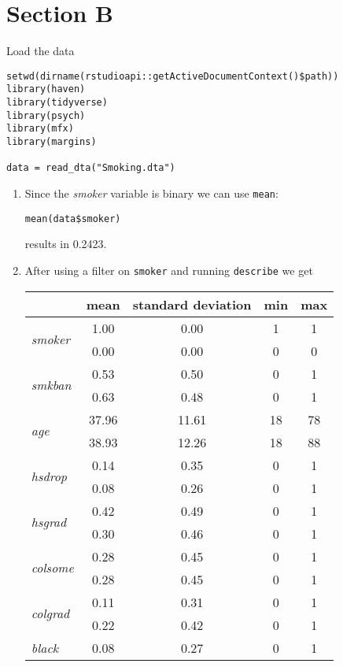 \documentclass{article}
\begin{document}
	\section*{Section B}
	Load the data
	\begin{lstlisting}
setwd(dirname(rstudioapi::getActiveDocumentContext()$path))
library(haven)
library(tidyverse)
library(psych)
library(mfx)
library(margins)

data = read_dta("Smoking.dta")
	\end{lstlisting}
	\begin{enumerate}[label=(\alph*)]
		\item Since the \textit{smoker} variable is binary we can use \texttt{mean}:
		\begin{lstlisting}[tabsize=2]
mean(data$smoker)
		\end{lstlisting}
		results in 0.2423.
		\item After using a filter on \texttt{smoker} and running \texttt{describe} we get
		\begin{center}
			\begin{tabular}{l|cccc}
				& \textbf{mean} & \textbf{standard deviation} & \textbf{min} & \textbf{max} \\
				\hline
				\multirow{2}{1.5cm}{\textit{smoker}} & 1.00 & 0.00 & 1 & 1 \\
				 & 0.00 & 0.00 & 0 & 0 \\
				\hline
				\multirow{2}{1.5cm}{\textit{smkban}} & 0.53 & 0.50 & 0 & 1 \\
				 & 0.63 & 0.48 & 0 & 1 \\
				\hline
				\multirow{2}{1.5cm}{\textit{age}} & 37.96 & 11.61 & 18 & 78 \\
				 & 38.93 & 12.26 & 18 & 88 \\
				\hline
				\multirow{2}{1.5cm}{\textit{hsdrop}} & 0.14 & 0.35 & 0 & 1 \\
				 & 0.08 & 0.26 & 0 & 1 \\
				\hline
				\multirow{2}{1.5cm}{\textit{hsgrad}} & 0.42 & 0.49 & 0 & 1 \\
				 & 0.30 & 0.46 & 0 & 1 \\
				\hline
				\multirow{2}{1.5cm}{\textit{colsome}} & 0.28 & 0.45 & 0 & 1 \\
				 & 0.28 & 0.45 & 0 & 1 \\
				\hline
				\multirow{2}{1.5cm}{\textit{colgrad}} & 0.11 & 0.31 & 0 & 1 \\
				 & 0.22 & 0.42 & 0 & 1 \\
				\hline
				\multirow{2}{1.5cm}{\textit{black}} & 0.08 & 0.27 & 0 & 1 \\

\end{tabular}
\end{center}
\end{enumerate}
\end{document}
